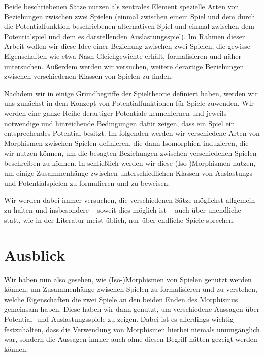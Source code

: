 \documentclass[a4paper,ngerman,11pt,bibliography=totoc]{scrartcl}
\theoremstyle{definition}
\theoremstyle{plain}
\theoremstyle{remark}
\begin{document}
Beide beschriebenen Sätze nutzen als zentrales Element spezielle Arten von Beziehungen zwischen zwei Spielen (einmal zwischen einem Spiel und dem durch die Potentialfunktion beschriebenen alternativen Spiel und einmal zwischen dem Potentialspiel und dem es darstellenden Auslastungsspiel). Im Rahmen dieser Arbeit wollen wir diese Idee einer Beziehung zwischen zwei Spielen, die gewisse Eigenschaften wie etwa Nash-Gleichgewichte erhält, formalisieren und näher untersuchen. Außerdem werden wir versuchen, weitere derartige Beziehungen zwischen verschiedenen Klassen von Spielen zu finden.

Nachdem wir in  einige Grundbegriffe der Spieltheorie definiert haben, werden wir uns zunächst in  dem Konzept von Potentialfunktionen für Spiele zuwenden. Wir werden eine ganze Reihe derartiger Potentiale kennenlernen und jeweils notwendige und hinreichende Bedingungen dafür zeigen, dass ein Spiel ein entsprechendes Potential besitzt. Im folgenden  werden wir verschiedene Arten von Morphismen zwischen Spielen definieren, die dann Isomorphien induzieren, die wir nutzen können, um die besagten Beziehungen zwischen verschiedenen Spielen beschreiben zu können. In  schließlich werden wir diese (Iso-)Morphismen nutzen, um einige Zusammenhänge zwischen unterschiedlichen Klassen von Auslastungs- und Potentialspielen zu formulieren und zu beweisen.

Wir werden dabei immer versuchen, die verschiedenen Sätze möglichst allgemein zu halten und insbesondere -- soweit dies möglich ist -- auch über unendliche statt, wie in der Literatur meist üblich, nur über endliche Spiele sprechen.






{}
\section*{Ausblick}

Wir haben nun also gesehen, wie (Iso-)Morphismen von Spielen genutzt werden können, um Zusammenhänge zwischen Spielen zu formalisieren und zu verstehen, welche Eigenschaften die zwei Spiele an den beiden Enden des Morphismus gemeinsam haben. Diese haben wir dann genutzt, um verschiedene Aussagen über Potential- und Auslastungsspiele zu zeigen. Dabei ist es allerdings wichtig festzuhalten, dass die Verwendung von Morphismen hierbei niemals unumgänglich war, sondern die Aussagen immer auch ohne diesen Begriff hätten gezeigt werden können. 
\end{document}
